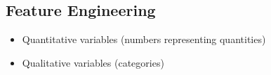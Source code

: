 \subsection{Feature Engineering}

\begin{itemize}
   \item Quantitative variables (numbers representing quantities)
   \item Qualitative variables (categories)
\end{itemize}




